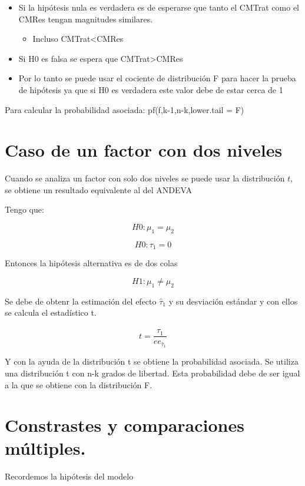 \documentclass[
]{article}
\providecommand{\tightlist}{%
  \setlength{\itemsep}{0pt}\setlength{\parskip}{0pt}}
\begin{document}
\begin{itemize}
\tightlist
\item
  Si la hipótesis nula es verdadera es de esperarse que tanto el CMTrat
  como el CMRes tengan magnitudes similares.

  \begin{itemize}
  \tightlist
  \item
    Incluso CMTrat\textless CMRes
  \end{itemize}
\item
  Si H0 es falsa se espera que CMTrat\textgreater CMRes
\item
  Por lo tanto se puede usar el cociente de distribución F para hacer la
  prueba de hipótesis ya que si H0 es verdadera este valor debe de estar
  cerca de 1
\end{itemize}

Para calcular la probabilidad asociada: pf(f,k-1,n-k,lower.tail = F)

\section{Caso de un factor con dos
niveles}\label{caso-de-un-factor-con-dos-niveles}

Cuando se analiza un factor con solo dos niveles se puede usar la
distribución \(t\), se obtiene un resultado equivalente al del ANDEVA

Tengo que:

\[
H0: \mu_1=\mu_2
\]

\[
H0: \tau_1=0
\]

Entonces la hipótesis alternativa es de dos colas

\[
H1: \mu_1 \neq \mu_2
\]

Se debe de obtenr la estimación del efecto \(\hat \tau_1\) y su
desviación estándar y con ellos se calcula el estadístico t.

\[
t=\frac{\hat \tau_1}{ee_{\hat \tau_1}}
\]

Y con la ayuda de la distribución t se obtiene la probabilidad asociada.
Se utiliza una distribución t con n-k grados de libertad. Esta
probabilidad debe de ser igual a la que se obtiene con la distribución
F.

\section{Constrastes y comparaciones
múltiples.}\label{constrastes-y-comparaciones-muxfaltiples.}

Recordemos la hipótesis del modelo
\end{document}
